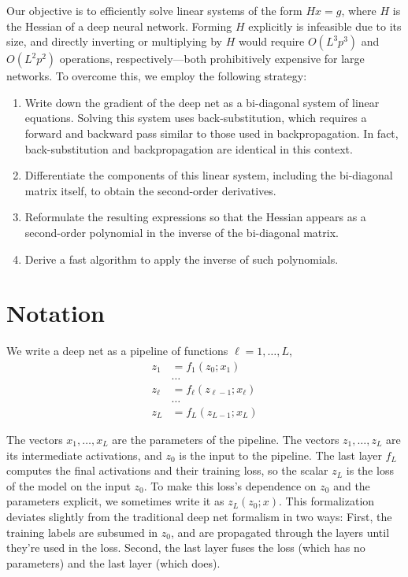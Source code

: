 \documentclass{article}
\begin{document}
Our objective is to efficiently solve linear systems of the form $H x = g$,
where $H$ is the Hessian of a deep neural network. Forming $H$ explicitly is
infeasible due to its size, and directly inverting or multiplying by $H$ would
require $O(L^3p^3)$ and $O(L^2p^2)$ operations, respectively---both
prohibitively expensive for large networks. To overcome this, we employ the
following strategy:
\begin{enumerate}
    \item
          Write down the gradient of the deep net as a bi-diagonal system of linear
          equations. Solving this system uses back-substitution, which requires a forward
          and backward pass similar to those used in backpropagation. In fact,
          back-substitution and backpropagation are identical in this context.
    \item
          Differentiate the components of this linear system, including the bi-diagonal
          matrix itself, to obtain the second-order derivatives.
    \item
          Reformulate the resulting expressions so that the Hessian appears as a
          second-order polynomial in the inverse of the bi-diagonal matrix.
    \item
          Derive a fast algorithm to apply the inverse of such polynomials.
\end{enumerate}

\section{Notation}

We write a deep net as a pipeline of functions $\ell = 1, \ldots, L$,
\begin{align}
    z_1    & = f_1(z_0; x_1) \nonumber              \\
           & \ldots \nonumber                       \\
    z_\ell & = f_\ell(z_{\ell-1}; x_\ell) \nonumber \\
           & \ldots \nonumber                       \\
    z_L    & = f_L(z_{L-1}; x_L)
\end{align}

The vectors $x_1,\ldots, x_L$ are the parameters of the pipeline. The vectors
$z_1,\ldots, z_L$ are its intermediate activations, and $z_0$ is the input to
the pipeline. The last layer $f_L$ computes the final activations and their
training loss, so the scalar $z_L$ is the loss of the model on the input $z_0$.
To make this loss's dependence on $z_0$ and the parameters explicit, we
sometimes write it as $z_L(z_0;x)$. This formalization deviates slightly from
the traditional deep net formalism in two ways: First, the training labels are
subsumed in $z_0$, and are propagated through the layers until they're used in
the loss. Second, the last layer fuses the loss (which has no parameters) and
the last layer (which does).
\end{document}

